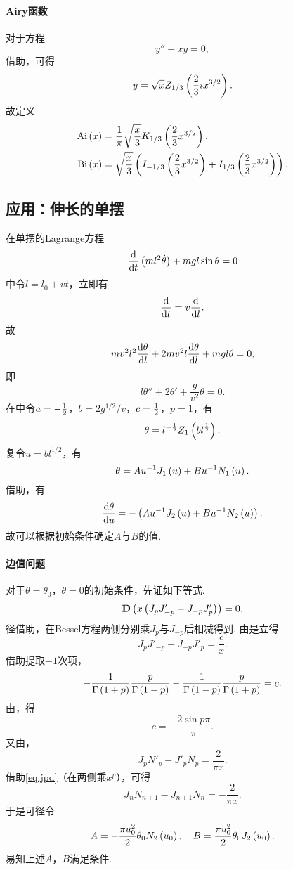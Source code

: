 \documentclass[UTF-8]{ctexart}
\begin{document}
  \paragraph{Airy函数}对于方程
  \[ y''-xy=0, \]
  借助，可得
  \[ y = \sqrt{x}Z_{1/3}\left(\frac{2}{3}ix^{3/2}\right). \]
  故定义
  \begin{align*}
    \text{Ai}\left(x\right) &= \frac{1}{\pi}\sqrt{\frac{x}{3}}K_{1/3}\left(\frac{2}{3}x^{3/2}\right),\\
    \text{Bi}\left(x\right) &= \sqrt{\frac{x}{3}}\left(I_{-1/3}\left(\frac{2}{3}x^{3/2}\right)+I_{1/3}\left(\frac{2}{3}x^{3/2}\right)\right).
  \end{align*}
  \subsection{应用：伸长的单摆}
  在单摆的Lagrange方程
  \[ \frac{\mathrm{d}}{\mathrm{d} t}{}\left(ml^2\dot{\theta}\right) + mgl\sin\theta = 0 \]
  中令$l = l_0 + vt $，立即有
  \[ \frac{\mathrm{d}}{\mathrm{d} t}{} = v\frac{\mathrm{d} }{\mathrm{d} l}. \]
  故
  \[ mv^2l^2 \frac{\mathrm{d} \theta}{\mathrm{d} l} + 2mv^2l\frac{\mathrm{d} \theta}{\mathrm{d} l} + mgl\theta = 0, \]
  即
  \[ l \theta'' + 2\theta' + \frac{g}{v^2}\theta = 0. \]
  在中令$a=-\frac{1}{2}$，$b=2g^{1/2}/v$，$c=\frac{1}{2}$，$p=1$，有
  \[ \theta=l^{-\frac{1}{2}}Z_1\left(bl^{\frac{1}{2}}\right). \]
  复令$u=bl^{1/2}$，有
  \[ \theta = Au^{-1}J_1\left(u\right) + Bu^{-1}N_1\left(u\right). \]
  借助，有
  \[ \frac{\mathrm{d} \theta}{\mathrm{d} u} = -\left(Au^{-1}J_2\left(u\right) + Bu^{-1}N_2\left(u\right)\right). \]
  故可以根据初始条件确定$A$与$B$的值. 
  \paragraph{边值问题}对于$\theta=\theta_0$，$\dot{\theta}=0$的初始条件，先证如下等式.
  \[ \mathbf{D}\left(x\left(J_pJ'_{-p}-J_{-p}J'_p\right)\right) = 0. \]
  径借助，在Bessel方程两侧分别乘$J_p$与$J_{-p}$后相减得到. 由是立得
  \[ J_pJ'_{-p}-J_{-p}J'_p = \frac{c}{x}. \]
  借助提取$-1$次项，
  \[ -\frac{1}{\Gamma\left(1+p\right)}\frac{p}{\Gamma\left(1-p\right)} - \frac{1}{\Gamma\left(1-p\right)}\frac{p}{\Gamma\left(1+p\right)} = c. \]
  由，得
  \[ c = -\frac{2 \sin p\pi}{\pi}. \]
  又由，
  \[ J_pN'_p-J'_pN_p = \frac{2}{\pi x}. \]
  借助\eqref{eq:jpd}（在两侧乘$x^p$），可得
  \[ J_nN_{n+1} - J_{n+1}N_n = -\frac{2}{\pi x}. \]
  于是可径令
  \[ A=-\frac{\pi u_0^2}{2}\theta_0N_2\left(u_0\right),\quad B = \frac{\pi u_0^2}{2}\theta_0J_2\left(u_0\right). \]
  易知上述$A$，$B$满足条件.
\end{document}
